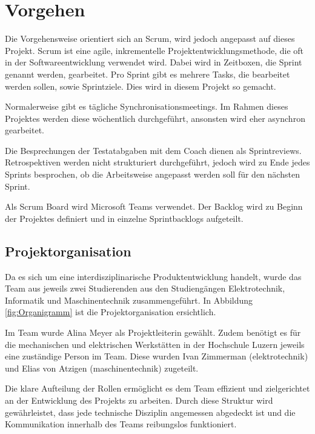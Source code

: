 \section{Vorgehen}

Die Vorgehensweise orientiert sich an Scrum, wird jedoch angepasst auf dieses Projekt.
Scrum ist eine agile, inkrementelle Projektentwicklungsmethode, die oft in der Softwareentwicklung verwendet wird. Dabei wird in Zeitboxen, die Sprint genannt werden, gearbeitet. Pro Sprint gibt es mehrere Tasks, die bearbeitet werden sollen, sowie Sprintziele. Dies wird in diesem Projekt so gemacht.\cite{wikipedia-scrum}

Normalerweise gibt es tägliche Synchronisationsmeetings. Im Rahmen dieses Projektes werden diese wöchentlich durchgeführt, ansonsten wird eher asynchron gearbeitet.

Die Besprechungen der Testatabgaben mit dem Coach dienen als Sprintreviews. Retrospektiven werden nicht strukturiert durchgeführt, jedoch wird zu Ende jedes Sprints besprochen, ob die Arbeitsweise angepasst werden soll für den nächsten Sprint.

Als Scrum Board wird Microsoft Teams verwendet. Der Backlog wird zu Beginn der Projektes definiert und in einzelne Sprintbacklogs aufgeteilt.

\subsection{Projektorganisation}

Da es sich um eine interdisziplinarische Produktentwicklung handelt, wurde das Team aus jeweils zwei Studierenden aus den Studiengängen Elektrotechnik, Informatik und Maschinentechnik zusammengeführt. In Abbildung \ref{fig:Organigramm} ist die Projektorganisation ersichtlich. 

Im Team wurde Alina Meyer als Projektleiterin gewählt. Zudem benötigt es für die mechanischen und elektrischen Werkstätten in der Hochschule Luzern jeweils eine zuständige Person im Team. Diese wurden Ivan Zimmerman (\acrshort{elektrotechnik}) und Elias von Atzigen (\acrshort{maschinentechnik}) zugeteilt.

Die klare Aufteilung der Rollen ermöglicht es dem Team effizient und zielgerichtet an der Entwicklung des Projekts zu arbeiten. Durch diese Struktur wird gewährleistet, dass jede technische Disziplin angemessen abgedeckt ist und die Kommunikation innerhalb des Teams reibungslos funktioniert.

